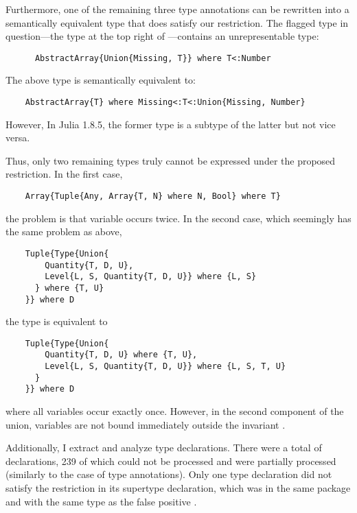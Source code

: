 Furthermore, one of the remaining three type annotations can be rewritten
into a semantically equivalent
type that does satisfy our restriction. The flagged type in 
question---the  type at the top right of
---contains an unrepresentable type:
\begin{codeenvd}
\begin{lstlisting}
      AbstractArray{Union{Missing, T}} where T<:Number
\end{lstlisting}
\end{codeenvd}
The above type is semantically equivalent to:
\begin{codeenvd}
\begin{lstlisting}
    AbstractArray{T} where Missing<:T<:Union{Missing, Number}
\end{lstlisting}
\end{codeenvd}
However, In Julia 1.8.5, the former type is a subtype of the latter
but not vice versa.

Thus, only two remaining types truly cannot be expressed under
the proposed restriction.
%
In the first case, 
\begin{codeenvd}
\begin{lstlisting}
    Array{Tuple{Any, Array{T, N} where N, Bool} where T}
\end{lstlisting}
\end{codeenvd}
the problem is that variable  occurs twice.
%
In the second case, which seemingly has the same problem as above,
\begin{codeenvd}
\begin{lstlisting}
    Tuple{Type{Union{
        Quantity{T, D, U}, 
        Level{L, S, Quantity{T, D, U}} where {L, S}
      } where {T, U}
    }} where D
\end{lstlisting}
\end{codeenvd}
the type is equivalent to
\begin{codeenvd}
\begin{lstlisting}
    Tuple{Type{Union{
        Quantity{T, D, U} where {T, U}, 
        Level{L, S, Quantity{T, D, U}} where {L, S, T, U}
      }
    }} where D
\end{lstlisting}
\end{codeenvd}
where all variables occur exactly once.
However, in the second component of the union, variables 
are not bound immediately outside the invariant .

Additionally, I extract and analyze type declarations.
There were a total of  declarations,
239 of which could not be processed and  were partially
processed (similarly to the case of type annotations). 
Only one type declaration did not satisfy the restriction in its supertype
declaration, which was in the same package and with the same type as the
false positive .

